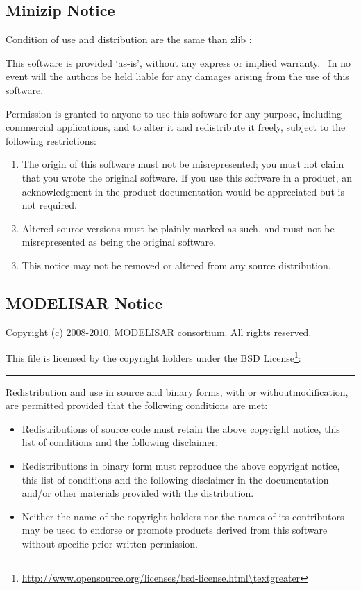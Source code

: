 \subsection{Minizip Notice}\label{minizip-notice}

Condition of use and distribution are the same than zlib :

This software is provided `as-is', without any express or implied warranty.~ In no event will the authors be held liable for any damages arising from the use of this software.

Permission is granted to anyone to use this software for any purpose, including commercial applications, and to alter it and redistribute it freely, subject to the following restrictions:

\begin{enumerate}
\def\labelenumi{\arabic{enumi}.}
\item
  The origin of this software must not be misrepresented; you must not claim that you wrote the original software. If you use this software in a product, an acknowledgment in the product documentation would be appreciated but is not required.
\item
  Altered source versions must be plainly marked as such, and must not be misrepresented as being the original software.
\item
  This notice may not be removed or altered from any source distribution.
\end{enumerate}

\subsection{MODELISAR Notice}\label{modelisar-notice}

Copyright (c) 2008-2010, MODELISAR consortium. All rights reserved.

This file is licensed by the copyright holders under the BSD License\footnote{\url{http://www.opensource.org/licenses/bsd-license.html\textgreater}}:

\begin{center}\rule{0.5\linewidth}{0.4pt}\end{center}

Redistribution and use in source and binary forms, with or withoutmodification, are permitted provided that the following conditions are met:

\begin{itemize}
\item
  Redistributions of source code must retain the above copyright notice, this list of conditions and the following disclaimer.
\item
  Redistributions in binary form must reproduce the above copyright notice, this list of conditions and the following disclaimer in the documentation and/or other materials provided with the distribution.
\item
  Neither the name of the copyright holders nor the names of its contributors may be used to endorse or promote products derived from this software without specific prior written permission.
\end{itemize}

